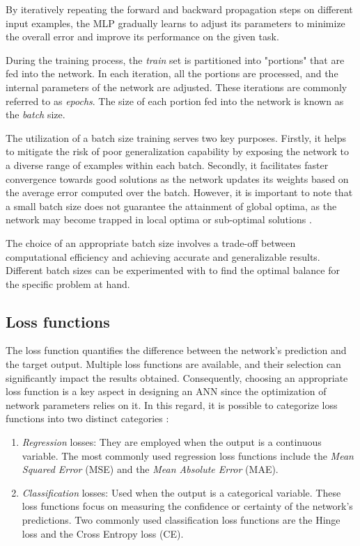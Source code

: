 By iteratively repeating the forward and backward propagation steps on different input examples, the MLP gradually learns to adjust its parameters to minimize the overall error and improve its performance on the given task. 



During the training process, the \textit{train} set is partitioned into "portions" that are fed into the network. In each iteration, all the portions are processed, and the internal parameters of the network are adjusted. These iterations are commonly referred to as \textit{epochs}. The size of each portion fed into the network is known as the \textit{batch} size.

The utilization of a batch size training serves two key purposes. Firstly, it helps to mitigate the risk of poor generalization capability by exposing the network to a diverse range of examples within each batch. Secondly, it facilitates faster convergence towards good solutions as the network updates its weights based on the average error computed over the batch. However, it is important to note that a small batch size does not guarantee the attainment of global optima, as the network may become trapped in local optima or sub-optimal solutions \cite{KANDEL2020312}.

The choice of an appropriate batch size involves a trade-off between computational efficiency and achieving accurate and generalizable results. Different batch sizes can be experimented with to find the optimal balance for the specific problem at hand.

\subsection{Loss functions}

The loss function quantifies the difference between the network's prediction and the target output. Multiple loss functions are available, and their selection can significantly impact the results obtained. Consequently, choosing an appropriate loss function is a key aspect in designing an ANN since the optimization of network parameters relies on it. In this regard, it is possible to categorize loss functions into two distinct categories \cite{CLFML}:
\begin{enumerate}
	\item \textit{Regression} losses: They are employed when the output is a continuous variable. The most commonly used regression loss functions include the \textit{Mean Squared Error} (MSE) and the \textit{Mean Absolute Error} (MAE). 
	\item \textit{Classification} losses: Used when the output is a categorical variable. These loss functions focus on measuring the confidence or certainty of the network's predictions. Two commonly used classification loss functions are the Hinge loss and the Cross Entropy loss (CE).
\end{enumerate}

